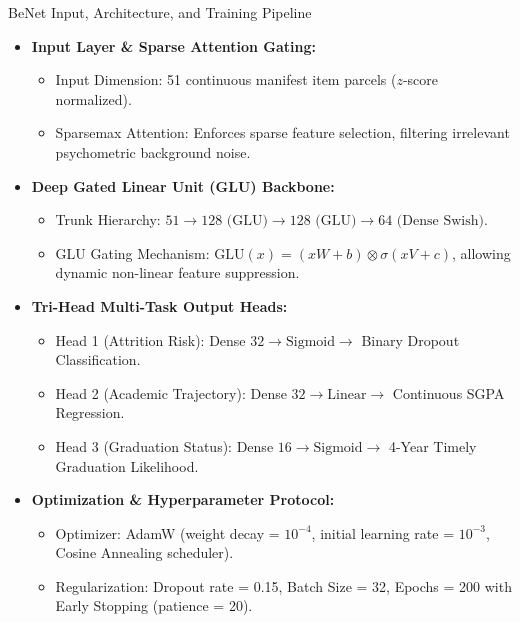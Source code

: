 \documentclass{beamer}
\begin{document}
\begin{frame}[t]{BeNet Input, Architecture, and Training Pipeline}
  \begin{itemize}\setlength{\itemsep}{5pt}\small
    \item \textbf{Input Layer \& Sparse Attention Gating:}
    \begin{itemize}\setlength{\itemsep}{2pt}\footnotesize
      \item Input Dimension: 51 continuous manifest item parcels ($z$-score normalized).
      \item Sparsemax Attention: Enforces sparse feature selection, filtering irrelevant psychometric background noise.
    \end{itemize}
    \item \textbf{Deep Gated Linear Unit (GLU) Backbone:}
    \begin{itemize}\setlength{\itemsep}{2pt}\footnotesize
      \item Trunk Hierarchy: $51 \to 128 \text{ (GLU)} \to 128 \text{ (GLU)} \to 64 \text{ (Dense Swish)}$.
      \item GLU Gating Mechanism: $\text{GLU}(x) = (x W + b) \otimes \sigma(x V + c)$, allowing dynamic non-linear feature suppression.
    \end{itemize}
    \item \textbf{Tri-Head Multi-Task Output Heads:}
    \begin{itemize}\setlength{\itemsep}{2pt}\footnotesize
      \item Head 1 (Attrition Risk): Dense $32 \to \text{Sigmoid} \to$ Binary Dropout Classification.
      \item Head 2 (Academic Trajectory): Dense $32 \to \text{Linear} \to$ Continuous SGPA Regression.
      \item Head 3 (Graduation Status): Dense $16 \to \text{Sigmoid} \to$ 4-Year Timely Graduation Likelihood.
    \end{itemize}
    \item \textbf{Optimization \& Hyperparameter Protocol:}
    \begin{itemize}\setlength{\itemsep}{2pt}\footnotesize
      \item Optimizer: AdamW (weight decay = $10^{-4}$, initial learning rate = $10^{-3}$, Cosine Annealing scheduler).
      \item Regularization: Dropout rate = 0.15, Batch Size = 32, Epochs = 200 with Early Stopping (patience = 20).
    \end{itemize}
  \end{itemize}
\end{frame}
\end{document}
